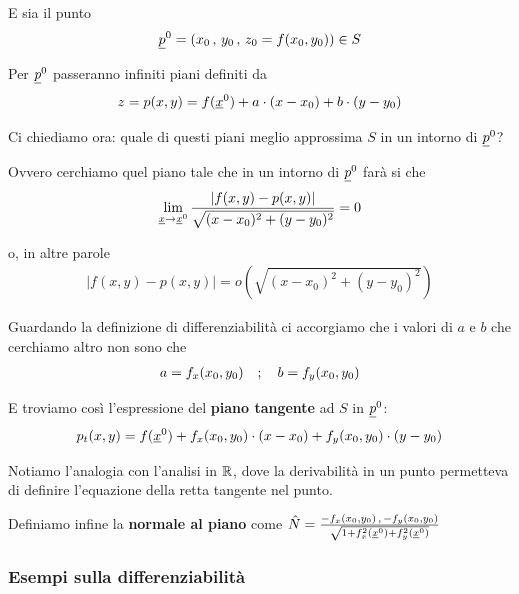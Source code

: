 E sia il punto
\begin{align}
\underline{p}^0 = (x_0 \, , \, y_0 \, , \, z_0=f(x_0,y_0)) \in S
\end{align}

Per $\underline{p}^0$ passeranno infiniti piani definiti da
\begin{align}
z=p(x,y)= f(\underline{x}^0) + a \cdot (x-x_0) + b \cdot (y-y_0)
\end{align}

Ci chiediamo ora: quale di questi piani meglio approssima $S$ in un intorno di $\underline{p}^0$? 

\smallskip

Ovvero cerchiamo quel piano tale che in un intorno di $\underline{p}^0$ farà si che
\begin{align}
\underset{\underline{x} \rightarrow \underline{x}^0}{\lim} \, \frac{|f(x,y) - p(x,y)|}{\sqrt{(x-x_0)^2 + (y-y_0)^2}}=0
\end{align}

o, in altre parole
\begin{align}
|f(x,y) - p(x,y)|= o(\sqrt{(x-x_0)^2 + (y-y_0)^2})
\end{align}

Guardando la definizione di differenziabilità ci accorgiamo che i valori di $a$ e $b$ che cerchiamo altro non sono che
\begin{align}
a= f_x(x_0,y_0) \quad ; \quad b=f_y(x_0,y_0)
\end{align}

E troviamo così l'espressione del \textbf{piano tangente} ad $S$ in $\underline{p}^0$: 
\begin{align}
p_t(x,y)= f(\underline{x}^0) + f_x(x_0,y_0) \cdot (x-x_0) + f_y(x_0,y_0) \cdot (y-y_0)
\end{align}

Notiamo l'analogia con l'analisi in $\mathbb{R}$, dove la derivabilità in un punto permetteva di definire l'equazione della retta tangente nel punto.

Definiamo infine la \textbf{normale al piano} come $\hat{N}=\frac{-f_x(x_0,y_0) \, , \, -f_y(x_0,y_0)}{\sqrt{1+ f_x^2(\underline{x}^0) + f_y^2(\underline{x}^0)} }$

\newpage

\subsubsection{Esempi sulla differenziabilità}

